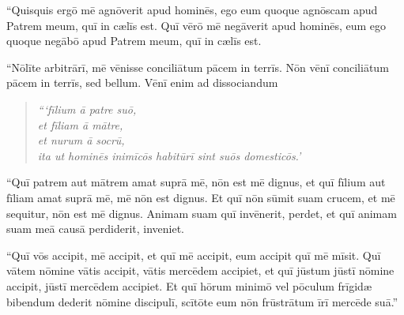 \Versus ``Quisquis ergō mē agnōverit apud hominēs, ego eum quoque agnōscam apud Patrem meum, quī in cælīs est. 
\Versus Quī vērō mē negāverit apud hominēs, eum ego quoque negābō apud Patrem meum, quī in cælīs est.

\Versus ``Nōlīte arbitrārī, mē vēnisse conciliātum pācem in terrīs. Nōn vēnī conciliātum pācem in terrīs, sed bellum. 
\Versus Vēnī enim ad dissociandum

\begin{verse}
\begin{patverse*}
\emph{``{}`fīlium ā patre suō,\\
et fīliam ā mātre,\\
et nurum ā socrū,\\
\Versus ita ut hominēs inimīcōs habitūrī sint suōs domesticōs.'}
\end{patverse*}
\end{verse}

\Versus ``Quī patrem aut mātrem amat suprā mē, nōn est mē dignus, et quī fīlium aut fīliam amat suprā mē, mē nōn est dignus. 
\Versus Et quī nōn sūmit suam crucem, et mē sequitur, nōn est mē dignus. 
\Versus Animam suam quī invēnerit, perdet, et quī animam suam meā causā perdiderit, inveniet.

\Versus ``Quī vōs accipit, mē accipit, et quī mē accipit, eum accipit quī mē mīsit. 
\Versus Quī vātem nōmine vātis accipit, vātis mercēdem accipiet, et quī jūstum jūstī nōmine accipit, jūstī mercēdem accipiet. 
\Versus Et quī hōrum minimō vel pōculum frīgidæ bibendum dederit nōmine discipulī, scītōte eum nōn frūstrātum īrī mercēde suā.''




